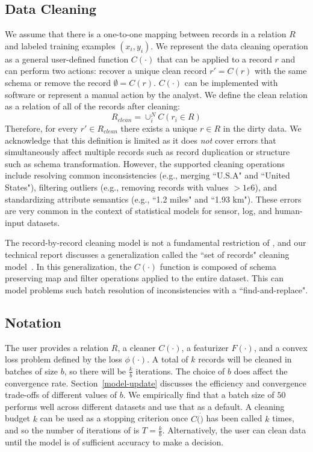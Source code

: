 \subsection{Data Cleaning}\label{dcmodel}
We assume that there is a one-to-one mapping between records in a relation $R$ and labeled training examples $(x_{i},y_{i})$.
We represent the data cleaning operation as a general user-defined function $C(\cdot)$ that can be applied to a record $r$ and can perform two actions: recover a unique clean record $r' = C(r)$ with the same schema or remove the record $\emptyset = C(r)$.
$C(\cdot)$ can be implemented with software or represent a manual action by the analyst.
We define the clean relation as a relation of all of the records after cleaning:
\[R_{clean} = \cup_i^N C(r_i \in R)\]
Therefore, for every $r' \in R_{clean}$ there exists a unique $r \in R$ in the dirty data.
We acknowledge that this definition is limited as it does \emph{not} cover errors that simultaneously affect multiple records such as record duplication or structure such as schema transformation.
However, the supported cleaning operations include resolving common inconsistencies (e.g., merging ``U.S.A" and ``United States"), filtering outliers (e.g., removing records with values $>1e6$), and standardizing attribute semantics (e.g., ``1.2 miles" and ``1.93 km").
These errors are very common in the context of statistical models for sensor, log, and human-input datasets. 

The record-by-record cleaning model is not a fundamental restriction of \sys, and our technical report discusses a generalization called the ``set of records" cleaning model~\cite{activecleanarxiv}.
In this generalization, the $C(\cdot)$ function is composed of schema preserving \textsf{map} and \textsf{filter} operations applied to the entire dataset.
This can model problems such batch resolution of inconsistencies with a ``find-and-replace".

\subsection{Notation}\label{notation}
The user provides a relation $R$, a cleaner $C(\cdot)$, a featurizer $F(\cdot)$, and a convex loss problem defined by the loss $\phi(\cdot)$.
A total of $k$ records will be cleaned in batches of size $b$, so there will be $\frac{k}{b}$ iterations.  The choice of $b$ does affect the convergence rate.
Section~\ref{model-update} discusses the efficiency and convergence trade-offs of different values of $b$.
We empirically find that a batch size of $50$ performs well across different datasets and use that as a default.
A cleaning budget $k$ can be used as a stopping criterion once $C(\dot)$ has been called $k$ times, and so the number of iterations of \sys is $T = \frac{k}{b}$.
Alternatively, the user can clean data until the model is of sufficient accuracy to make a decision.

